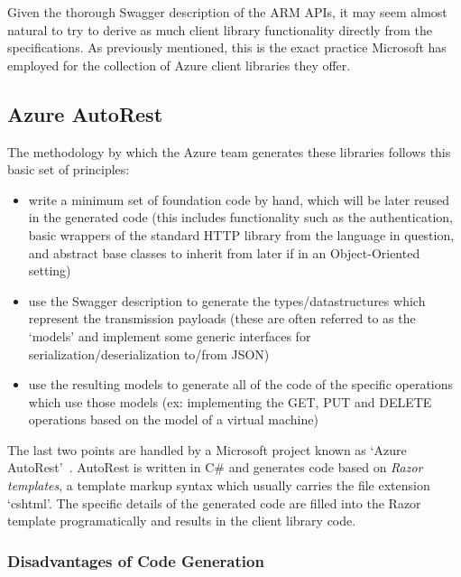 \documentclass[11pt]{report}
\begin{document}
Given the thorough Swagger description of the ARM APIs, it may seem almost
natural to try to derive as much client library functionality directly from the
specifications. As previously mentioned, this is the exact practice
Microsoft has employed for the collection of Azure client libraries they offer.

\subsection{Azure AutoRest}

The methodology by which the Azure team generates these libraries follows this
basic set of principles:

\begin{itemize}
    \item{} write a minimum set of foundation code by hand, which will be later
        reused in the generated code (this includes functionality such as the
        authentication, basic wrappers of the standard HTTP library from the
        language in question, and abstract base classes to inherit from later if
        in an Object-Oriented setting)
    \item{} use the Swagger description to generate the types/datastructures
        which represent the transmission payloads (these are often referred to
        as the `models' and implement some generic interfaces for
        serialization/deserialization to/from JSON)
    \item{} use the resulting models to generate all of the code of the
        specific operations which use those models (ex: implementing the
        GET, PUT and DELETE operations based on the model of a virtual machine)
\end{itemize}

The last two points are handled by a Microsoft project known
as `Azure AutoRest'~\cite{azureAutoRest}. AutoRest is written in C\# and
generates code based on \textit{Razor templates}, a template markup syntax
which usually carries the file extension `cshtml'. The specific details of the
generated code are filled into the Razor template programatically and results
in the client library code.

\subsubsection{Disadvantages of Code Generation}
\end{document}
